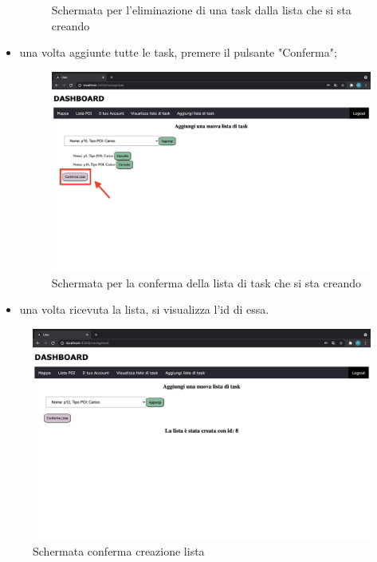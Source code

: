 \begin{itemize}
\begin{figure}[H]
        \caption{Schermata per l'eliminazione di una task dalla lista che si sta creando}
    \end{figure}
    \item una volta aggiunte tutte le task, premere il pulsante "Conferma";
    \begin{figure}[H]
        \centering
        \includegraphics[scale=0.12]{res/images/confermalista.png}
        \caption{Schermata per la conferma della lista di task che si sta creando}
    \end{figure}
    \item una volta ricevuta la lista, si visualizza l'id di essa.
    
\end{itemize}
\begin{figure}[H]
    \centering
    \includegraphics[scale=0.2]{res/images/listacreata.png}
    \caption{Schermata conferma creazione lista}
\end{figure}
